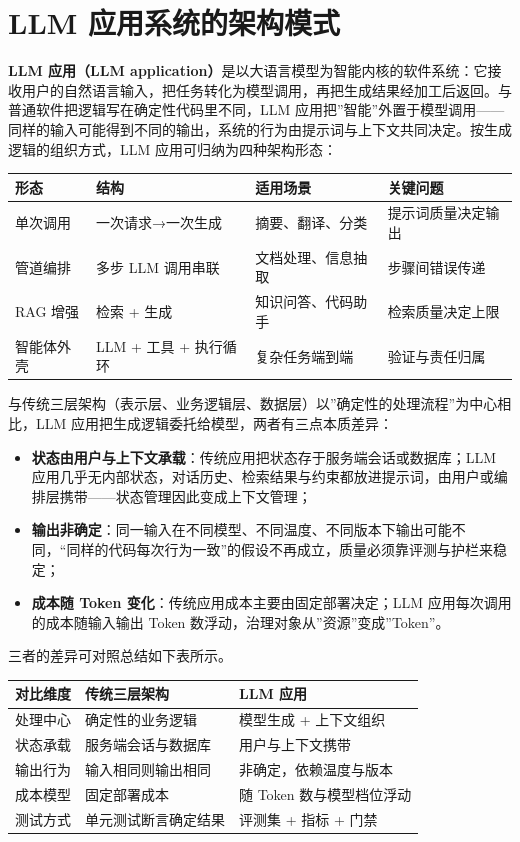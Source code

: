 \documentclass[12pt,a4paper,twoside,openany]{ctexbook}
\numberwithin{figure}{chapter}
\numberwithin{table}{chapter}
\providecommand{\tightlist}{\setlength{\itemsep}{0pt}\setlength{\parskip}{0pt}}
\newcounter{none}
\begin{document}
\section{LLM
应用系统的架构模式}\label{llm-ux5e94ux7528ux7cfbux7edfux7684ux67b6ux6784ux6a21ux5f0f}

\textbf{LLM 应用（LLM
application）}是以大语言模型为智能内核的软件系统：它接收用户的自然语言输入，把任务转化为模型调用，再把生成结果经加工后返回。与普通软件把逻辑写在确定性代码里不同，LLM
应用把''智能''外置于模型调用------同样的输入可能得到不同的输出，系统的行为由提示词与上下文共同决定。按生成逻辑的组织方式，LLM
应用可归纳为四种架构形态：

{\def\LTcaptype{none} %
\begin{longtable}[]{@{}llll@{}}
\toprule\noalign{}
形态 & 结构 & 适用场景 & 关键问题 \\
\midrule\noalign{}
\endhead
\bottomrule\noalign{}
\endlastfoot
单次调用 & 一次请求→一次生成 & 摘要、翻译、分类 & 提示词质量决定输出 \\
管道编排 & 多步 LLM 调用串联 & 文档处理、信息抽取 & 步骤间错误传递 \\
RAG 增强 & 检索 + 生成 & 知识问答、代码助手 & 检索质量决定上限 \\
智能体外壳 & LLM + 工具 + 执行循环 & 复杂任务端到端 & 验证与责任归属 \\
\end{longtable}
}

与传统三层架构（表示层、业务逻辑层、数据层）以''确定性的处理流程''为中心相比，LLM
应用把生成逻辑委托给模型，两者有三点本质差异：

\begin{itemize}
\tightlist
\item
  \textbf{状态由用户与上下文承载}：传统应用把状态存于服务端会话或数据库；LLM
  应用几乎无内部状态，对话历史、检索结果与约束都放进提示词，由用户或编排层携带------状态管理因此变成上下文管理；
\item
  \textbf{输出非确定}：同一输入在不同模型、不同温度、不同版本下输出可能不同，``同样的代码每次行为一致''的假设不再成立，质量必须靠评测与护栏来稳定；
\item
  \textbf{成本随 Token 变化}：传统应用成本主要由固定部署决定；LLM
  应用每次调用的成本随输入输出 Token
  数浮动，治理对象从''资源''变成''Token''。
\end{itemize}

三者的差异可对照总结如下表所示。

{\def\LTcaptype{none} %
\begin{longtable}[]{@{}lll@{}}
\toprule\noalign{}
对比维度 & 传统三层架构 & LLM 应用 \\
\midrule\noalign{}
\endhead
\bottomrule\noalign{}
\endlastfoot
处理中心 & 确定性的业务逻辑 & 模型生成 + 上下文组织 \\
状态承载 & 服务端会话与数据库 & 用户与上下文携带 \\
输出行为 & 输入相同则输出相同 & 非确定，依赖温度与版本 \\
成本模型 & 固定部署成本 & 随 Token 数与模型档位浮动 \\
测试方式 & 单元测试断言确定结果 & 评测集 + 指标 + 门禁 \\
\end{longtable}
}
\end{document}
